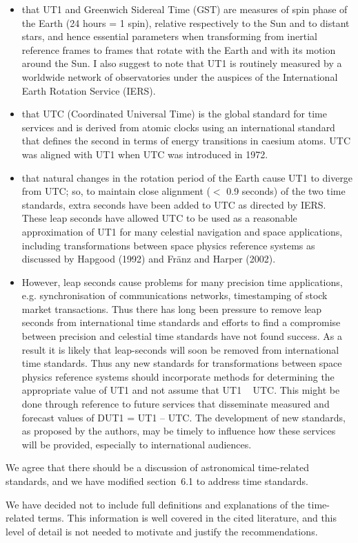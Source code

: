 \documentclass[11pt]{article}
\begin{document}
\begin{itemize}
\item[a)] that UT1 and Greenwich Sidereal Time (GST) are measures of spin phase of the Earth (24 hours = 1
spin), relative respectively to the Sun and to distant stars, and hence essential parameters when
transforming from inertial reference frames to frames that rotate with the Earth and with its motion
around the Sun. I also suggest to note that UT1 is routinely measured by a worldwide network of
observatories under the auspices of the International Earth Rotation Service (IERS).

\item[b)] that UTC (Coordinated Universal Time) is the global standard for time services and is derived from
atomic clocks using an international standard that defines the second in terms of energy transitions
in caesium atoms. UTC was aligned with UT1 when UTC was introduced in 1972.

\item[c)] that natural changes in the rotation period of the Earth cause UT1 to diverge from UTC; so, to
maintain close alignment ($<$ 0.9 seconds) of the two time standards, extra seconds have been added to UTC as directed by IERS. These leap seconds have allowed UTC to be used as a reasonable
approximation of UT1 for many celestial navigation and space applications, including
transformations between space physics reference systems as discussed by Hapgood (1992) and
Fränz and Harper (2002).

\item[d)] However, leap seconds cause problems for many precision time applications, e.g. synchronisation of
communications networks, timestamping of stock market transactions. Thus there has long been
pressure to remove leap seconds from international time standards and efforts to find a
compromise between precision and celestial time standards have not found success. As a result it is
likely that leap-seconds will soon be removed from international time standards. Thus any new
standards for transformations between space physics reference systems should incorporate
methods for determining the appropriate value of UT1 and not assume that UT1 ~ UTC. This might
be done through reference to future services that disseminate measured and forecast values of
DUT1 = UT1 – UTC. The development of new standards, as proposed by the authors, may be timely
to influence how these services will be provided, especially to international audiences.
\end{itemize}
\vspace{1em}
{\color{violet}
\begin{leftbar}
We agree that there should be a discussion of astronomical time-related standards, and we have modified section~6.1 to address time standards.

We have decided not to include full definitions and explanations of the time-related terms. This information is well covered in the cited literature, and this level of detail is not needed to motivate and justify the recommendations.
\end{leftbar}
}
\end{document}
